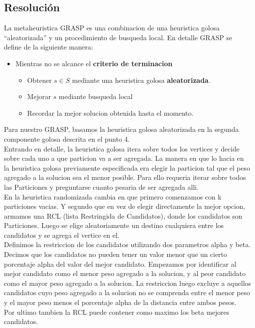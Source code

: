\subsection{Resoluci\'on}

La metaheuristica GRASP es una combinacion de una heuristica golosa “aleatorizada” y un procedimiento de busqueda local. En detalle GRASP se define de la siguiente manera:

\begin{itemize}
\item Mientras no se alcance el \textbf{criterio de terminacion}
  \begin{itemize}
  \item Obtener $s \in S$ mediante una heuristica golosa \textbf{aleatorizada}.
  \item Mejorar $s$ mediante busqueda local
  \item Recordar la mejor solucion obtenida hasta el momento.
  \end{itemize}
\end{itemize}

Para nuestro GRASP, basamos la heuristica golosa aleatorizada en la segunda componente golosa descrita en el punto 4. \\
Entrando en detalle, la heuristica golosa itera sobre todos los vertices y decide sobre cada uno a que particion va a ser agregada. La manera en que lo hacia en la heuristica golosa previamente especificada era elegir la particion tal que el peso agregado a la solucion sea el menor posible. Para ello requeria iterar sobre todos las Particiones y preguntarse cuanto pesaria de ser agregada alli. \\
En la heuristica randomizada cambia en que primero comenzamos con k particiones vacias. Y segundo que en vez de elegir directamente la mejor opcion, armamos una RCL (lista Restringida de Candidatos), donde los candidatos son Particiones. Luego se elige aleatoriamente un destino cualquiera entre los candidatos y se agrega el vertice en el.\\
Definimos la restriccion de los candidatos utilizando dos parametros alpha y beta. \\
Decimos que los candidatos no pueden tener un valor menor que un cierto porcentaje alpha del valor del mejor candidato. Empezamos por identificar al mejor candidato como el menor peso agregado a la solucion, y al peor candidato como el mayor peso agregado a la solucion. La restriccion luego excluye a aquellos candidatos cuyo peso agregado a la solucion no se comprenda entre el menor peso y el mayor peso menos el porcentaje alpha de la distancia entre ambos pesos.\\
Por ultimo tambien la RCL puede contener como maximo los beta mejores candidatos.

